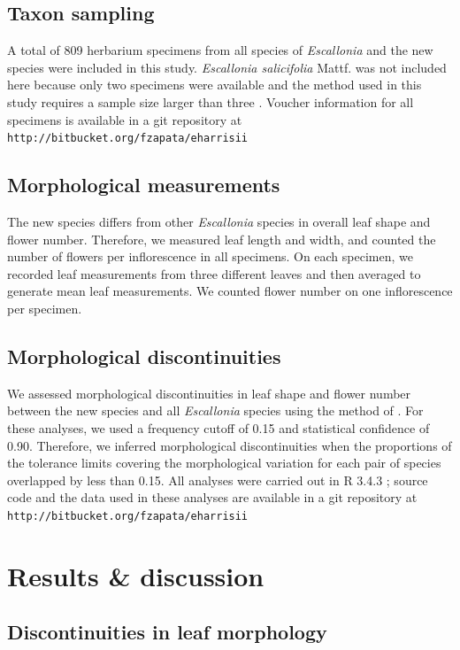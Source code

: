 \documentclass[fleqn,10pt,lineno]{wlpeerj} %
\begin{document}
\subsection*{Taxon sampling}

A total of 809 herbarium specimens from all species of \emph{Escallonia} and the new species were included in this study. \emph{Escallonia salicifolia} Mattf. was not included here because only two specimens were available and the method used in this study requires a sample size larger than three \citep{Zapata:2012it}. Voucher information for all specimens is available in a git repository at \texttt{http://bitbucket.org/fzapata/eharrisii}

\subsection*{Morphological measurements}

The new species differs from other \emph{Escallonia} species in overall leaf shape and flower number. Therefore, we measured leaf length and width, and counted the number of flowers per inflorescence in all specimens. On each specimen, we recorded leaf measurements from three different leaves and then averaged to generate mean leaf measurements. We counted flower number on one inflorescence per specimen.

\subsection*{Morphological discontinuities}

We assessed morphological discontinuities in leaf shape and flower number between the new species and all \emph{Escallonia} species using the method of \cite{Zapata:2012it}. For these analyses, we used a frequency cutoff of 0.15 and statistical confidence of 0.90. Therefore, we inferred morphological discontinuities when the proportions of the tolerance limits covering the morphological variation for each pair of species overlapped by less than 0.15. All analyses were carried out in R 3.4.3 \citep{R-base}; source code and the data used in these analyses are available in a git repository at \texttt{http://bitbucket.org/fzapata/eharrisii}

\section*{Results \& discussion}

\subsection*{Discontinuities in leaf morphology}
\end{document}
